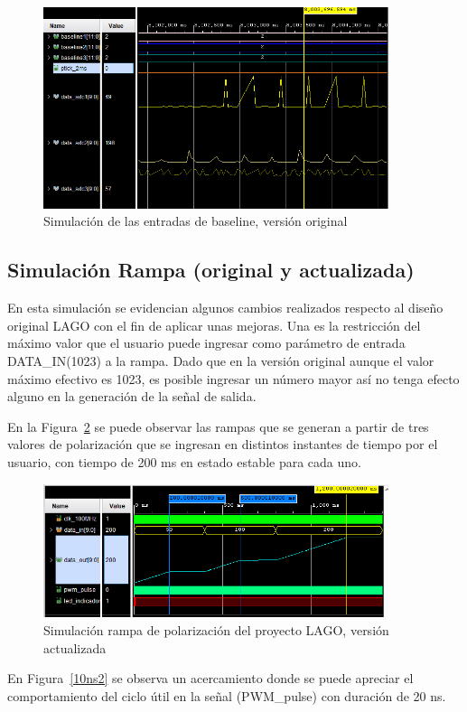 \begin{figure}[H]
\includegraphics[width=0.9\textwidth]{Figs/zombase.PNG} 
\centering
\caption{Simulación de las entradas de baseline, versión original}
\label{baseor}
\end{figure}

\subsection{Simulación Rampa (original y actualizada)}
En esta simulación se evidencian algunos cambios realizados respecto al diseño original LAGO con el fin de aplicar unas mejoras. Una es la restricción del máximo valor que el usuario puede ingresar como parámetro de entrada DATA\_IN(1023) a la rampa.
Dado que en la versión original aunque el valor máximo efectivo es 1023, es posible ingresar un número mayor así no tenga efecto alguno en la generación de la señal de salida.

En la Figura~\ref{10ns} se puede observar las rampas que se generan a partir de tres valores de polarización que se ingresan en distintos instantes de tiempo por el usuario, con tiempo de 200 ms en estado estable para cada uno.

\begin{figure}[H]
\includegraphics[width=0.9\textwidth]{Figs/Rampa_100Mhz.PNG} 
\centering
\caption{Simulación rampa de polarización del proyecto LAGO, versión actualizada}
\label{10ns}
\end{figure}
En Figura~\ref{10ns2} se observa un acercamiento donde se puede apreciar el comportamiento del ciclo útil en la señal (PWM\_pulse) con duración de 20 ns.


